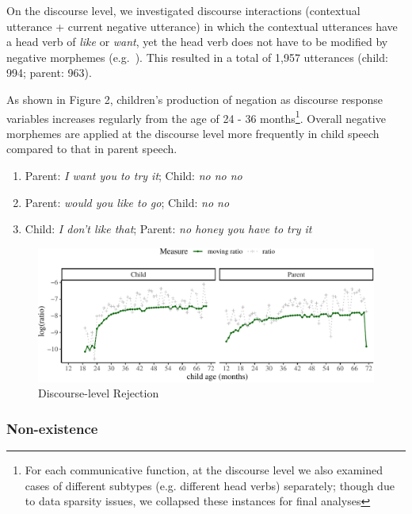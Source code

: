 \documentclass[
  english,
  man,floatsintext]{apa6}
\providecommand{\tightlist}{%
  \setlength{\itemsep}{0pt}\setlength{\parskip}{0pt}}
\begin{document}
On the discourse level, we investigated discourse interactions (contextual utterance + current negative utterance) in which the contextual utterances have a head verb of \emph{like} or \emph{want}, yet the head verb does not have to be modified by negative morphemes (e.g.~). This resulted in a total of 1,957 utterances (child: 994; parent: 963).

As shown in Figure 2, children's production of negation as discourse response variables increases regularly from the age of 24 - 36 months\footnote{For each communicative function, at the discourse level we also examined cases of different subtypes (e.g. different head verbs) separately; though due to data sparsity issues, we collapsed these instances for final analyses}. Overall negative morphemes are applied at the discourse level more frequently in child speech compared to that in parent speech.

\begin{enumerate}
\def\labelenumi{(\arabic{enumi})}
\setcounter{enumi}{5}
\tightlist
\item
  Parent: \emph{I want you to try it}; Child: \emph{no no no}
\item
  Parent: \emph{would you like to go}; Child: \emph{no no}
\item
  Child: \emph{I don't like that}; Parent: \emph{no honey you have to try it}
\end{enumerate}

\begin{figure}[H]

{\centering \includegraphics{neg_construction_article_files/figure-latex/emotiondiscourse-1} 

}

\caption{Discourse-level Rejection}\label{fig:emotiondiscourse}
\end{figure}

\clearpage

\hypertarget{non-existence}{%
\subsubsection{Non-existence}\label{non-existence}}
\end{document}
